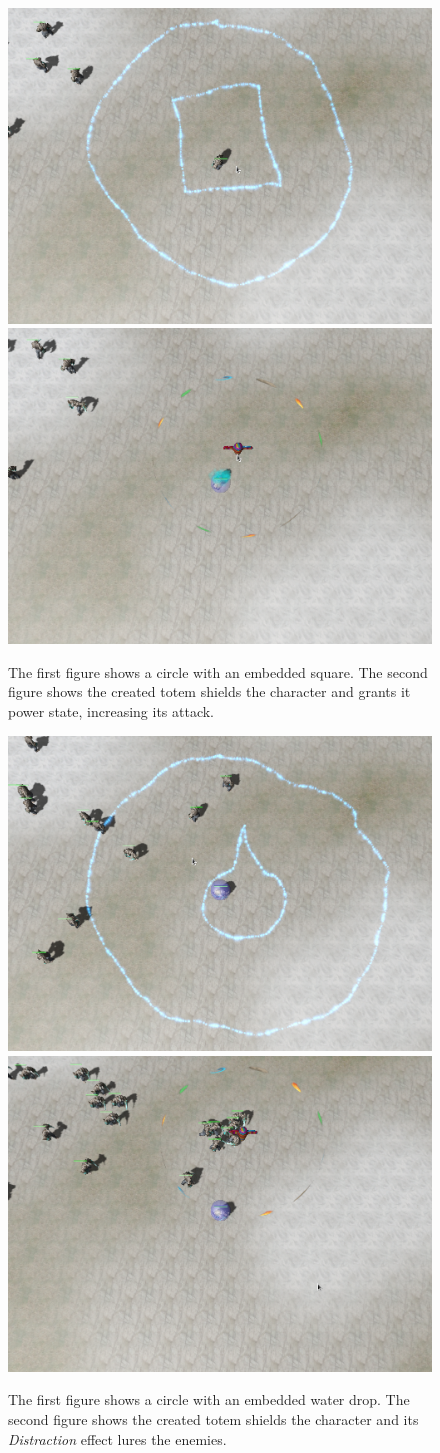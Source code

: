 \begin{figure}[p]
\centering
\includegraphics[width=.47\linewidth]{ext/scr/embsquare.png}
\quad
\includegraphics[width=.47\linewidth]{ext/scr/embsquaree.png}
\caption{The first figure shows a circle with an embedded square. The second figure shows the created totem shields the character and grants it power state, increasing its attack.}
\label{fig:spell:embsquare}
\end{figure}

\begin{figure}[p]
\centering
\includegraphics[width=.47\linewidth]{ext/scr/embwaterDrop.png}
\quad
\includegraphics[width=.47\linewidth]{ext/scr/embwaterDrope.png}
\caption{The first figure shows a circle with an embedded water drop. The second figure shows the created totem shields the character and its \emph{Distraction} effect lures the enemies.}
\label{fig:spell:embwaterDrop}
\end{figure}



